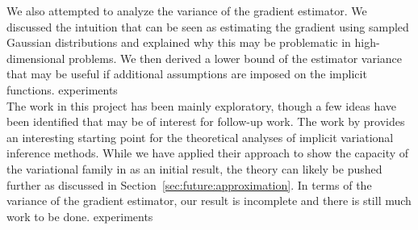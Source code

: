 \documentclass[10pt]{article}
\begin{document}
We also attempted to analyze the variance of the \elbo gradient estimator. We discussed the intuition that \uivi can be seen as estimating the \elbo gradient using sampled Gaussian distributions and explained why this may be problematic in high-dimensional problems. We then derived a lower bound of the estimator variance that may be useful if additional assumptions are imposed on the implicit functions. \todo experiments
\\

The work in this project has been mainly exploratory, though a few ideas have been identified that may be of interest for follow-up work. The work by \citet{Plummer:2021} provides an interesting starting point for the theoretical analyses of implicit variational inference methods. While we have applied their approach to show the capacity of the variational family in \uivi as an initial result, the theory can likely be pushed further as discussed in Section~\ref{sec:future:approximation}. In terms of the variance of the \elbo gradient estimator, our result is incomplete and there is still much work to be done. \todo experiments


\newpage




\end{document}
